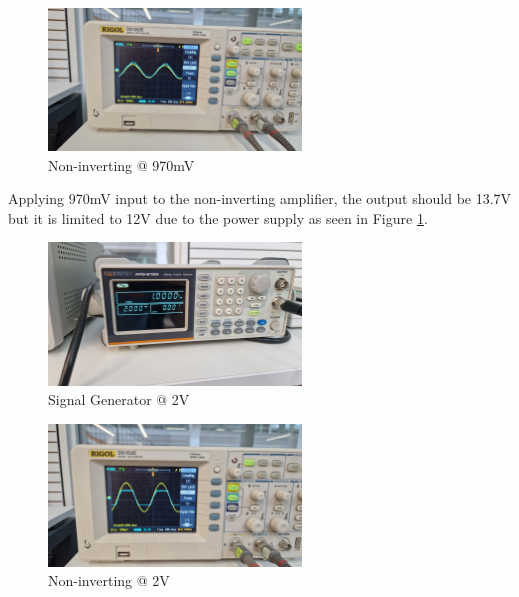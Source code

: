 \begin{figure}[h]
    \centering
    \includegraphics[width=0.6\textwidth]{assets/non-inverting-970m-output.jpg}
    \caption{Non-inverting @ 970mV}
    \label{fig:non-inverting-970m-output}
\end{figure}

Applying 970mV input to the non-inverting amplifier, the output should be 13.7V but it is limited to 12V due to the power supply as seen in Figure \ref{fig:non-inverting-970m-output}.

\newpage
\thispagestyle{plain}

\begin{figure}[h]
    \centering
    \includegraphics[width=0.6\textwidth]{assets/non-inverting-2.jpg}
    \caption{Signal Generator @ 2V}
    \label{fig:non-inverting-2}
\end{figure}

\begin{figure}[h]
    \centering
    \includegraphics[width=0.6\textwidth]{assets/non-inverting-2-output.jpg}
    \caption{Non-inverting @ 2V}
    \label{fig:non-inverting-2-output}
\end{figure}

